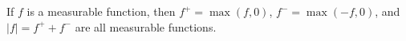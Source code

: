 If $f$ is a measurable function, then $f^+ = \max(f, 0)$, $f^- = \max(-f, 0)$, and $|f| = f^+ + f^-$ are all measurable functions.
